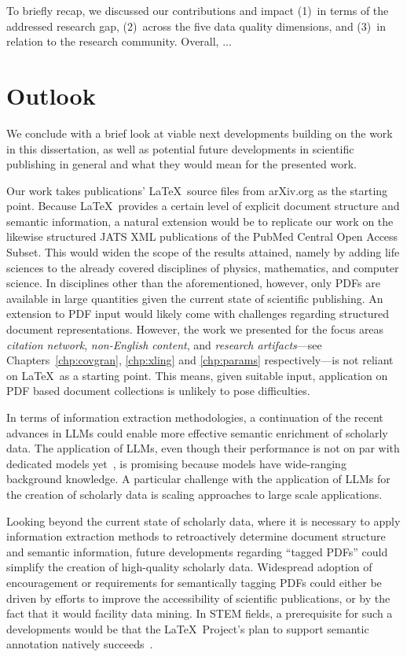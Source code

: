 To briefly recap, we discussed our contributions and impact (1)~in terms of the addressed research gap, (2)~across the five data quality dimensions, and (3)~in relation to the research community. Overall, ...

\section{Outlook}

We conclude with a brief look at viable next developments building on the work in this dissertation, as well as potential future developments in scientific publishing in general and what they would mean for the presented work.

Our work takes publications' \LaTeX\ source files from arXiv.org as the starting point. Because \LaTeX\ provides a certain level of explicit document structure and semantic information, a natural extension would be to replicate our work on the likewise structured JATS XML publications of the PubMed Central Open Access Subset. This would widen the scope of the results attained, namely by adding life sciences to the already covered disciplines of physics, mathematics, and computer science. In disciplines other than the aforementioned, however, only PDFs are available in large quantities given the current state of scientific publishing. An extension to PDF input would likely come with challenges regarding structured document representations. However, the work we presented for the focus areas \emph{citation network}, \emph{non-English content}, and \emph{research artifacts}---see Chapters~\ref{chp:covgran}, \ref{chp:xling} and \ref{chp:params} respectively---is not reliant on \LaTeX\ as a starting point. This means, given suitable input, application on PDF based document collections is unlikely to pose difficulties.

In terms of information extraction methodologies, a continuation of the recent advances in LLMs could enable more effective semantic enrichment of scholarly data. The application of LLMs, even though their performance is not on par with dedicated models yet~\cite{Yang2023}, is promising because models have wide-ranging background knowledge. A particular challenge with the application of LLMs for the creation of scholarly data is scaling approaches to large scale applications.

Looking beyond the current state of scholarly data, where it is necessary to apply information extraction methods to retroactively determine document structure and semantic information, future developments regarding ``tagged PDFs'' could simplify the creation of high-quality scholarly data. Widespread adoption of encouragement or requirements for semantically tagging PDFs could either be driven by efforts to improve the accessibility of scientific publications, or by the fact that it would facility data mining. In STEM fields, a prerequisite for such a developments would be that the \LaTeX\ Project's plan to support semantic annotation natively succeeds~\cite{Mittelbach2020,Mittelbach2023}.

